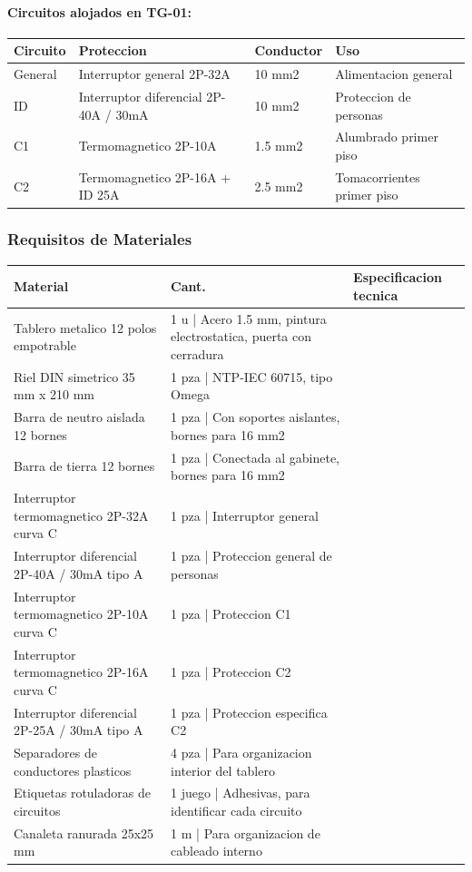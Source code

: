 \paragraph{Circuitos alojados en TG-01:}
\begin{longtable}{L{2.5cm} L{5.0cm} L{3.0cm} L{3.5cm}}
\toprule
\textbf{Circuito} & \textbf{Proteccion} & \textbf{Conductor} & \textbf{Uso} \\
\midrule
General & Interruptor general 2P-32A & 10 mm2 & Alimentacion general \\
ID & Interruptor diferencial 2P-40A / 30mA & 10 mm2 & Proteccion de personas \\
C1 & Termomagnetico 2P-10A & 1.5 mm2 & Alumbrado primer piso \\
C2 & Termomagnetico 2P-16A + ID 25A & 2.5 mm2 & Tomacorrientes primer piso \\
\bottomrule
\end{longtable}

\subsubsection{Requisitos de Materiales}

\begin{longtable}{L{5.0cm} L{2.0cm} L{7.5cm}}
\toprule
\textbf{Material} & \textbf{Cant.} & \textbf{Especificacion tecnica} \\
\midrule
Tablero metalico 12 polos empotrable & 1 u | Acero 1.5 mm, pintura electrostatica, puerta con cerradura \\
Riel DIN simetrico 35 mm x 210 mm & 1 pza | NTP-IEC 60715, tipo Omega \\
Barra de neutro aislada 12 bornes & 1 pza | Con soportes aislantes, bornes para 16 mm2 \\
Barra de tierra 12 bornes & 1 pza | Conectada al gabinete, bornes para 16 mm2 \\
Interruptor termomagnetico 2P-32A curva C & 1 pza | Interruptor general \\
Interruptor diferencial 2P-40A / 30mA tipo A & 1 pza | Proteccion general de personas \\
Interruptor termomagnetico 2P-10A curva C & 1 pza | Proteccion C1 \\
Interruptor termomagnetico 2P-16A curva C & 1 pza | Proteccion C2 \\
Interruptor diferencial 2P-25A / 30mA tipo A & 1 pza | Proteccion especifica C2 \\
Separadores de conductores plasticos & 4 pza | Para organizacion interior del tablero \\
Etiquetas rotuladoras de circuitos & 1 juego | Adhesivas, para identificar cada circuito \\
Canaleta ranurada 25x25 mm & 1 m | Para organizacion de cableado interno \\
\bottomrule
\end{longtable}

